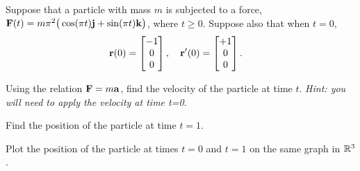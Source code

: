 Suppose that a particle with mass $m$ is subjected to a force, $\mathbf{F}(t) = m\pi^2\big(\cos(\pi t)\mathbf{j}+\sin(\pi t)\mathbf{k}\big)$, where $t \ge 0$. Suppose also that when $t=0$, 
\begin{align*}
  \mathbf{r}(0) &= \begin{bmatrix} -1 \\ 0 \\ 0 \end{bmatrix} , \quad
  \mathbf{r}'(0) = \begin{bmatrix} +1 \\ 0 \\ 0 \end{bmatrix}.
\end{align*}
\BEN
\item Using the relation $\mathbf{F} = m\mathbf{a}$, find the velocity of the particle at time $t$. \textit{Hint: you will need to apply the velocity at time t=0}.
\item Find the position of the particle at time $t=1$.
\item Plot the position of the particle at times $t=0$ and $t=1$ on the same graph in $\mathbb{R}^3$.
\EEN
\EEN %


